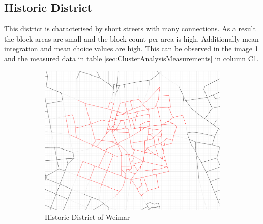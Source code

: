 \documentclass[11pt, a4paper]{report}
\begin{document}
\subsection{Historic District}
\label{sec:historyDistinct}
This district is characterised by short streets with many connections. As a result the block areas are small and the block count per area is high. Additionally mean integration and mean choice values are high. This can be observed in the image \ref{fig:historic_district} and the measured data in table \ref{sec:ClusterAnalysisMeasurements} in column C1.

\begin{figure}
    \centering
    \begin{subfigure}[b]{0.6\textwidth}
        \begin{mdframed}[style=mdthight]
            \includegraphics[width=\linewidth]{historic_district.png}
        \end{mdframed}
        \caption{Historic District of Weimar}
        \label{fig:historic_district}
    \end{subfigure}
    \par\medskip
    \begin{subfigure}[b]{0.6\textwidth}
        \begin{mdframed}[style=mdthight]

\end{mdframed}
\end{subfigure}
\end{figure}
\end{document}
